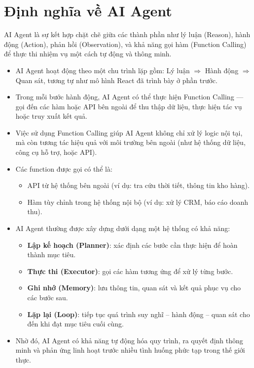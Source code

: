 \documentclass[final,letterpaper,twoside,12pt]{report}
\begin{document}
\section{Định nghĩa về AI Agent}

AI Agent là sự kết hợp chặt chẽ giữa các thành phần như lý luận (Reason), hành động (Action), phản hồi (Observation), và khả năng gọi hàm (Function Calling) để thực thi nhiệm vụ một cách tự động và thông minh.

\begin{itemize}
    \item AI Agent hoạt động theo một chu trình lặp gồm: Lý luận $\Rightarrow$ Hành động $\Rightarrow$ Quan sát, tương tự như mô hình React đã trình bày ở phần trước.
    
    \item Trong mỗi bước hành động, AI Agent có thể thực hiện Function Calling — gọi đến các hàm hoặc API bên ngoài để thu thập dữ liệu, thực hiện tác vụ hoặc truy xuất kết quả.

    \item Việc sử dụng Function Calling giúp AI Agent không chỉ xử lý logic nội tại, mà còn tương tác hiệu quả với môi trường bên ngoài (như hệ thống dữ liệu, công cụ hỗ trợ, hoặc API).

    \item Các function được gọi có thể là: 
    \begin{itemize}
        \item API từ hệ thống bên ngoài (ví dụ: tra cứu thời tiết, thông tin kho hàng).
        \item Hàm tùy chỉnh trong hệ thống nội bộ (ví dụ: xử lý CRM, báo cáo doanh thu).
    \end{itemize}

    \item AI Agent thường được xây dựng dưới dạng một hệ thống có khả năng:
    \begin{itemize}
        \item \textbf{Lập kế hoạch (Planner)}: xác định các bước cần thực hiện để hoàn thành mục tiêu.
        \item \textbf{Thực thi (Executor)}: gọi các hàm tương ứng để xử lý từng bước.
        \item \textbf{Ghi nhớ (Memory)}: lưu thông tin, quan sát và kết quả phục vụ cho các bước sau.
        \item \textbf{Lặp lại (Loop)}: tiếp tục quá trình suy nghĩ – hành động – quan sát cho đến khi đạt mục tiêu cuối cùng.
    \end{itemize}
    
    \item Nhờ đó, AI Agent có khả năng tự động hóa quy trình, ra quyết định thông minh và phản ứng linh hoạt trước nhiều tình huống phức tạp trong thế giới thực.
\end{itemize}
\end{document}
